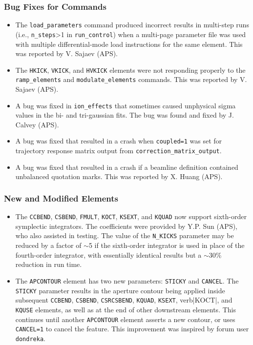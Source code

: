 \documentclass[11pt]{article}
\begin{document}
\subsubsection{Bug Fixes for Commands}
\begin{itemize}
\item The \verb|load_parameters| command produced incorrect results in multi-step runs (i.e., \verb|n_steps|>1 in
\verb|run_control|) when a multi-page parameter file was used with multiple differential-mode load instructions
for the same element. This was reported by V. Sajaev (APS).
\item The \verb|HKICK|, \verb|VKICK|, and \verb|HVKICK| elements were not responding properly to the \verb|ramp_elements|
  and \verb|modulate_elements| commands. This was reported by V. Sajaev (APS).
\item A bug was fixed in \verb|ion_effects| that sometimes caused unphysical sigma values in the bi- and tri-gaussian
  fits. The bug was found and fixed by J. Calvey (APS).
\item A bug was fixed that resulted in a crash when \verb|coupled=1| was set for trajectory response matrix output
  from \verb|correction_matrix_output|.
\item A bug was fixed that resulted in a crash if a beamline definition contained unbalanced quotation marks.
  This was reported by X. Huang (APS).
\end{itemize}

\subsubsection{New and Modified Elements}
\begin{itemize}
\item The \verb|CCBEND|, \verb|CSBEND|, \verb|FMULT|, \verb|KOCT|, \verb|KSEXT|, and \verb|KQUAD| now support 
  sixth-order symplectic integrators. The coefficients were provided by Y.P. Sun (APS), who also assisted in testing.
  The value of the \verb|N_KICKS| parameter may be reduced by a factor of $\sim$5 if the sixth-order integrator
  is used in place of the fourth-order integrator, with essentially identical results but a $\sim$30\% reduction
  in run time.
\item The \verb|APCONTOUR| element has two new parameters: \verb|STICKY| and \verb|CANCEL|. The \verb|STICKY|
  parameter results in the aperture contour being applied inside subsequent \verb|CCBEND|, \verb|CSBEND|, \verb|CSRCSBEND|,
  \verb|KQUAD|, \verb|KSEXT|, verb|KOCT|, and \verb|KQUSE| elements, as well as at the end of other downstream
  elements. This continues until another \verb|APCONTOUR| element asserts a new contour, or uses \verb|CANCEL=1|
  to cancel the feature.
  This improvement was inspired by forum user \verb|dondreka|.
\end{itemize}
\end{document}
